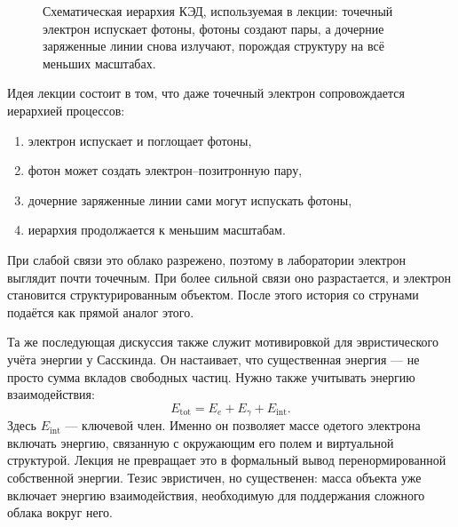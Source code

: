 \begin{figure}[htbp]
\centering
{}
\caption{Схематическая иерархия КЭД, используемая в лекции: точечный электрон испускает фотоны, фотоны создают пары, а дочерние заряженные линии снова излучают, порождая структуру на всё меньших масштабах.}
\end{figure}

Идея лекции состоит в том, что даже точечный электрон сопровождается иерархией процессов:
\begin{enumerate}
\item электрон испускает и поглощает фотоны,
\item фотон может создать электрон--позитронную пару,
\item дочерние заряженные линии сами могут испускать фотоны,
\item иерархия продолжается к меньшим масштабам.
\end{enumerate}
При слабой связи это облако разрежено, поэтому в лаборатории электрон выглядит почти точечным. При более сильной связи оно разрастается, и электрон становится структурированным объектом. После этого история со струнами подаётся как прямой аналог этого.

Та же последующая дискуссия также служит мотивировкой для эвристического учёта энергии у Сасскинда. Он настаивает, что существенная энергия — не просто сумма вкладов свободных частиц. Нужно также учитывать энергию взаимодействия:
\begin{equation}
E_{\mathrm{tot}} = E_e + E_\gamma + E_{\mathrm{int}}.
\end{equation}
Здесь \(E_{\mathrm{int}}\) — ключевой член. Именно он позволяет массе одетого электрона включать энергию, связанную с окружающим его полем и виртуальной структурой. Лекция не превращает это в формальный вывод перенормированной собственной энергии. Тезис эвристичен, но существенен: масса объекта уже включает энергию взаимодействия, необходимую для поддержания сложного облака вокруг него.

